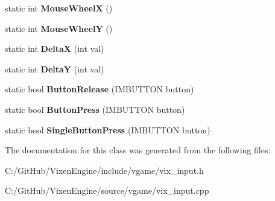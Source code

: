 \begin{DoxyCompactItemize}
\item 
\hypertarget{class_vixen_1_1_input_a7f911da1e7f8e7b0f9603c19b3ce2001}{}static int {\bfseries Mouse\+Wheel\+X} ()\label{class_vixen_1_1_input_a7f911da1e7f8e7b0f9603c19b3ce2001}

\item 
\hypertarget{class_vixen_1_1_input_a68db96702fdfc0f32c689eb85e893e66}{}static int {\bfseries Mouse\+Wheel\+Y} ()\label{class_vixen_1_1_input_a68db96702fdfc0f32c689eb85e893e66}

\item 
\hypertarget{class_vixen_1_1_input_ac359016a1a487301ce9179efdd27024e}{}static int {\bfseries Delta\+X} (int val)\label{class_vixen_1_1_input_ac359016a1a487301ce9179efdd27024e}

\item 
\hypertarget{class_vixen_1_1_input_a1f6ad690f2000577b2519d1b6ac49d52}{}static int {\bfseries Delta\+Y} (int val)\label{class_vixen_1_1_input_a1f6ad690f2000577b2519d1b6ac49d52}

\item 
\hypertarget{class_vixen_1_1_input_a533ecc845e83943b0fd1121e24b359c6}{}static bool {\bfseries Button\+Release} (I\+M\+B\+U\+T\+T\+O\+N button)\label{class_vixen_1_1_input_a533ecc845e83943b0fd1121e24b359c6}

\item 
\hypertarget{class_vixen_1_1_input_a6d061e0113e8505960baba84f36b90c8}{}static bool {\bfseries Button\+Press} (I\+M\+B\+U\+T\+T\+O\+N button)\label{class_vixen_1_1_input_a6d061e0113e8505960baba84f36b90c8}

\item 
\hypertarget{class_vixen_1_1_input_a2c47cee040a0d2163c0b24cfdc653556}{}static bool {\bfseries Single\+Button\+Press} (I\+M\+B\+U\+T\+T\+O\+N button)\label{class_vixen_1_1_input_a2c47cee040a0d2163c0b24cfdc653556}

\end{DoxyCompactItemize}


The documentation for this class was generated from the following files\+:\begin{DoxyCompactItemize}
\item 
C\+:/\+Git\+Hub/\+Vixen\+Engine/include/vgame/vix\+\_\+input.\+h\item 
C\+:/\+Git\+Hub/\+Vixen\+Engine/source/vgame/vix\+\_\+input.\+cpp\end{DoxyCompactItemize}
